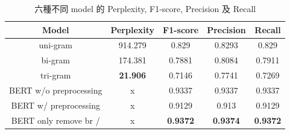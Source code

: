 \documentclass{article}[12pt]
\begin{document}
\begin{table}[H]
    \centering
    \caption{六種不同 model 的 Perplexity, F1-score, Precision 及 Recall}
    \begin{tabular}{ccccc} 
    \toprule
          Model                 & Perplexity      & F1-score        & Precision       & Recall           \\ 
    \hline
    uni-gram               & 914.279         & 0.829           & 0.8293          & 0.829            \\
    bi-gram                & 174.381         & 0.7881          & 0.8084          & 0.7911           \\
    tri-gram               & \textbf{21.906} & 0.7146          & 0.7741          & 0.7269           \\
    BERT w/o preprocessing & x               & 0.9337          & 0.9337          & 0.9337           \\
    BERT w/ preprocessing  & x               & 0.9129          & 0.913           & 0.9129           \\
    BERT only remove br /  & x               & \textbf{0.9372} & \textbf{0.9374} & \textbf{0.9372}  \\
    \bottomrule
    \end{tabular}
\end{table}
\end{document}
